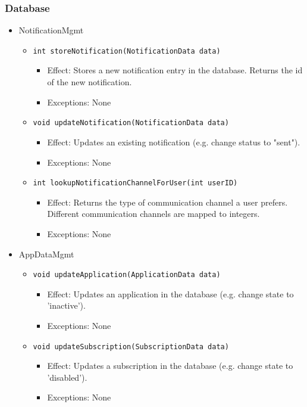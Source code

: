     \subsubsection{Database}
    \begin{itemize}
        \item NotificationMgmt
        \begin{itemize}
            \item \texttt{int storeNotification(NotificationData data)}
            \begin{itemize}
                \item Effect: Stores a new notification entry in the database. Returns the id of the new notification.
                \item Exceptions: None
            \end{itemize}
            \item \texttt{void updateNotification(NotificationData data)}
            \begin{itemize}
                \item Effect: Updates an existing notification (e.g. change status to "sent").
                \item Exceptions: None
            \end{itemize}
            \item \texttt{int lookupNotificationChannelForUser(int userID)}
            \begin{itemize}
                \item Effect: Returns the type of communication channel a user prefers.
                              Different communication channels are mapped to integers.
                \item Exceptions: None
            \end{itemize}
        \end{itemize}
        \item AppDataMgmt
        \begin{itemize}
            \item \texttt{void updateApplication(ApplicationData data)}
            \begin{itemize}
                \item Effect: Updates an application in the database (e.g. change state to 'inactive').
                \item Exceptions: None
            \end{itemize}
            \item \texttt{void updateSubscription(SubscriptionData data)}
            \begin{itemize}
                \item Effect: Updates a subscription in the database (e.g. change state to 'disabled').
                \item Exceptions: None
            \end{itemize}
        \end{itemize}
    \end{itemize}

